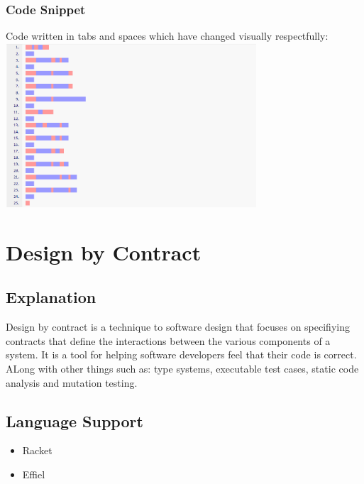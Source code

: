 \documentclass[12pt]{article}
\begin{document}
\subsubsection{Code Snippet}
\begin{center}
    Code written in tabs and spaces which have changed visually respectfully:
    \includegraphics[width=0.7\textwidth]{assets/whitespace.png}
    \cite{Question3Pics}
\end{center}

\section{Design by Contract \hfill {}}
\subsection{Explanation}
Design by contract is a technique to software design that focuses on specifiying contracts that define the interactions between the various components of a system.
It is a tool for helping software developers feel that their code is correct.
ALong with other things such as: type systems, executable test cases, static code analysis and mutation testing.
\cite{Question4DbC}
\subsection{Language Support}
\begin{itemize}
    \item Racket
    \cite{Question4Point1}
    \item Effiel
    \cite{Question4Point2}
\end{itemize}
\newpage



\end{document}
